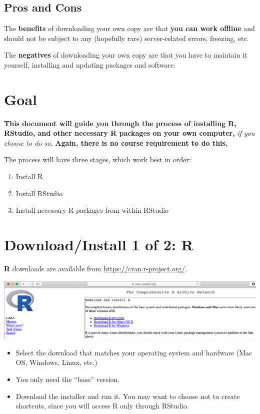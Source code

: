 \documentclass[
  letterpaper,
  DIV=11,
  numbers=noendperiod]{scrreprt}
\providecommand{\tightlist}{%
  \setlength{\itemsep}{0pt}\setlength{\parskip}{0pt}}\usepackage{longtable,booktabs,array}
\theoremstyle{remark}
\begin{document}
\subsection{Pros and Cons}\label{pros-and-cons}

The \textbf{benefits} of downloading your own copy are that \textbf{you
can work offline} and should not be subject to any (hopefully rare)
server-related errors, freezing, etc.

The \textbf{negatives} of downloading your own copy are that you have to
maintain it yourself, installing and updating packages and software.

\section{Goal}\label{goal}

\textbf{This document will guide you through the process of installing
R, RStudio, and other necessary R packages on your own computer,}
\emph{if you choose to do so.} \textbf{Again, there is no course
requirement to do this.}

The process will have three stages, which work best in order:

\begin{enumerate}
\def\labelenumi{\arabic{enumi}.}
\tightlist
\item
  Install R
\item
  Install RStudio
\item
  Install necessary R packages from within RStudio
\end{enumerate}

\section{Download/Install 1 of 2: R}\label{downloadinstall-1-of-2-r}

\textbf{R} downloads are available from
\url{https://cran.r-project.org/}.

\includegraphics[width=0.85\linewidth,height=\textheight,keepaspectratio]{./images/cran.png}

\begin{itemize}
\tightlist
\item
  Select the download that matches your operating system and hardware
  (Mac OS, Windows, Linux, etc.)
\item
  You only need the ``base'' version.
\item
  Download the installer and run it. You may want to choose not to
  create shortcuts, since you will access R only through RStudio.
\end{itemize}
\end{document}
